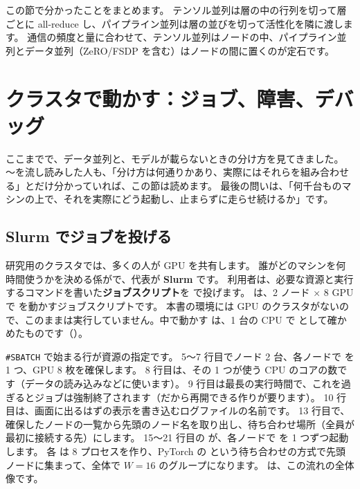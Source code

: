 この節で分かったことをまとめます。
テンソル並列は層の中の行列を切って層ごとに all-reduce し、パイプライン並列は層の並びを切って活性化を隣に渡します。
通信の頻度と量に合わせて、テンソル並列はノードの中、パイプライン並列とデータ並列（ZeRO/FSDP を含む）はノードの間に置くのが定石です。

\section{クラスタで動かす：ジョブ、障害、デバッグ}\label{sec:dist-cluster}

ここまでで、データ並列と、モデルが載らないときの分け方を見てきました。
〜を流し読みした人も、「分け方は何通りかあり、実際にはそれらを組み合わせる」とだけ分かっていれば、この節は読めます。
最後の問いは、「何千台ものマシンの上で、それを実際にどう起動し、止まらずに走らせ続けるか」です。

\subsection*{Slurm でジョブを投げる}

研究用のクラスタでは、多くの人が GPU を共有します。
誰がどのマシンを何時間使うかを決める係がで、代表が \textbf{Slurm} です。
利用者は、必要な資源と実行するコマンドを書いた\textbf{ジョブスクリプト}を  で投げます。
は、2 ノード × 8 GPU で  を動かすジョブスクリプトです。
本書の環境には GPU のクラスタがないので、このままは実行していません。中で動かす  は、1 台の CPU で  として確かめたものです（）。


\texttt{\#SBATCH} で始まる行が資源の指定です。
5〜7 行目でノード 2 台、各ノードで  を 1 つ、GPU 8 枚を確保します。
8 行目は、その  1 つが使う CPU のコアの数です（データの読み込みなどに使います）。
9 行目は最長の実行時間で、これを過ぎるとジョブは強制終了されます（だから再開できる作りが要ります）。
10 行目は、画面に出るはずの表示を書き込むログファイルの名前です。
13 行目で、確保したノードの一覧から先頭のノード名を取り出し、待ち合わせ場所（全員が最初に接続する先）にします。
15〜21 行目の  が、各ノードで  を 1 つずつ起動します。
各  は 8 プロセスを作り、PyTorch の  という待ち合わせの方式で先頭ノードに集まって、全体で $W=16$ のグループになります。
は、この流れの全体像です。

